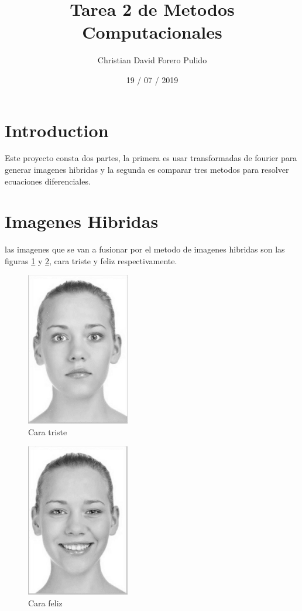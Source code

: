 \documentclass{article}
\title{Tarea 2 de Metodos Computacionales}
\author{Christian David Forero Pulido}
\date{19 / 07 / 2019}
\begin{document}
\maketitle

\section*{Introduction}

Este proyecto consta dos partes, la primera es usar transformadas de fourier para generar imagenes hibridas y la segunda es comparar tres metodos para resolver ecuaciones diferenciales.

\section{Imagenes Hibridas}
las imagenes que se van a fusionar por el metodo de imagenes hibridas son las figuras \ref{fig:mesh1} y \ref{fig:mesh2}, cara triste y feliz respectivamente.
\\
\begin{figure}
    \centering
    \includegraphics{cara_02_grisesMF.png}
    \caption{Cara triste}
    \label{fig:mesh1}
\end{figure}

\begin{figure}
    \centering
    \includegraphics{cara_03_grisesMF.png}
    \caption{Cara feliz}
    \label{fig:mesh2}
\end{figure}
\end{document}

